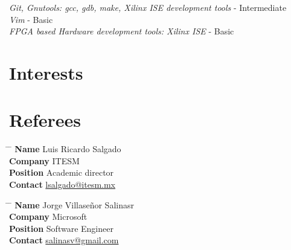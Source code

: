\documentclass[10pt]{article} %
\begin{document}
{
\textit{Git, Gnutools: gcc, gdb, make, Xilinx ISE development tools} - Intermediate\\
\textit{Vim} - Basic\\
\textit{FPGA based Hardware development tools: Xilinx ISE} - Basic\\
}


\section{Interests}



\section{Referees}

\parbox{0.5\textwidth}{ %
\begin{tabbing}
\hspace{2.75cm} \= \hspace{4cm} \= \kill %
{\bf Name} \> Luis Ricardo Salgado \\ %
{\bf Company} \> ITESM \\ %
{\bf Position} \> Academic director \\ %
{\bf Contact} \> \href{mailto:lsalgado@itesm.mx}{lsalgado@itesm.mx} %
\end{tabbing}}
\hfill %
\parbox{0.5\textwidth}{ %
\begin{tabbing}
\hspace{2.75cm} \= \hspace{4cm} \= \kill %
{\bf Name} \> Jorge Villaseñor Salinasr\\ %
{\bf Company} \> Microsoft \\ %
{\bf Position} \> Software Engineer \\ %
{\bf Contact} \> \href{mailto:salinasv@gmail.com}{salinasv@gmail.com} %
\end{tabbing}}

\end{document}
